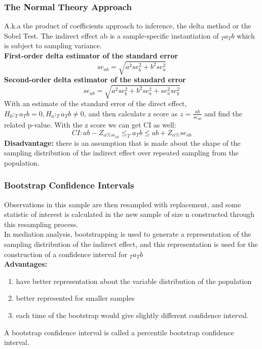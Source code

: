 \documentclass{article}
\theoremstyle{definition}
\begin{document}
\subsubsection{The Normal Theory Approach}
A.k.a the product of coefficients approach to inference, the delta method or the Sobel Test. The indirect effect ab is a sample-specific instantiation of $_Ta_Tb$ which is subject to sampling variance.\\
\textbf{First-order delta estimator of the standard error}
\begin{equation*}
	se_{ab} = \sqrt{a^2se_b^2+b^2se_a^2}
\end{equation*}
\textbf{Second-order delta estimator of the standard error}
\begin{equation*}
	se_{ab} = \sqrt{a^2se_b^2+b^2se_a^2+se_a^2se_b^2}
\end{equation*}
With an estimate of the standard error of the direct effect, $H_0: _Ta_Tb = 0, H_a: _Ta_Tb \neq 0$, and then calculate z score as $z = \frac{ab}{se_{ab}}$ and find the related p-value. With the z score we can get CI as well:
\begin{equation*}
	CI: ab-Z_{\alpha \% se_{ab}} \leq _Ta_Tb \leq ab + Z_{\alpha \%}se_{ab}
\end{equation*}
\textbf{Disadvantage: }there is an assumption that is made about the shape of the sampling distribution of the indirect effect over repeated sampling from the population.

\subsubsection{Bootstrap Confidence Intervals}
Observations in this sample are then resampled with replacement, and some statistic of interest is calculated in the new sample of size n constructed through this resampling process. \\
In mediation analysis, bootstrapping is used to generate a representation of the sampling distribution of the indirect effect, and this representation is used for the construction of a confidence interval for $_Ta_Tb$\\
\textbf{Advantages: }
\begin{enumerate}
	\item have better representation about the variable distribution of the population
	\item better represented for smaller samples
	\item each time of the bootstrap would give slightly different confidence interval.
\end{enumerate}
A bootstrap confidence interval is called a percentile bootstrap confidence interval.
\end{document}
